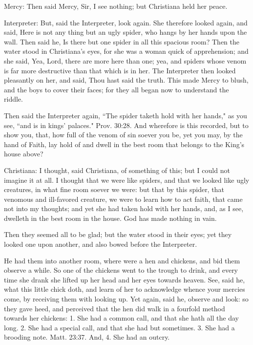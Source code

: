 Mercy: Then said Mercy, Sir, I see nothing; but Christiana held her peace.

Interpreter: But, said the Interpreter, look again. She therefore looked again, and said, Here is not any thing but an ugly spider, who hangs by her hands upon the wall. Then said he, Is there but one spider in all this spacious room? Then the water stood in Christiana's eyes, for she was a woman quick of apprehension; and she said, Yea, Lord, there are more here than one; yea, and spiders whose venom is far more destructive than that which is in her. The Interpreter then looked pleasantly on her, and said, Thou hast said the truth. This made Mercy to blush, and the boys to cover their faces; for they all began now to understand the riddle.

Then said the Interpreter again, ``The spider taketh hold with her hands," as you see, ``and is in kings' palaces." Prov. 30:28. And wherefore is this recorded, but to show you, that, how full of the venom of sin soever you be, yet you may, by the hand of Faith, lay hold of and dwell in the best room that belongs to the King's house above?

Christiana: I thought, said Christiana, of something of this; but I could not imagine it at all. I thought that we were like spiders, and that we looked like ugly creatures, in what fine room soever we were: but that by this spider, that venomous and ill-favored creature, we were to learn how to act faith, that came not into my thoughts; and yet she had taken hold with her hands, and, as I see, dwelleth in the best room in the house. God has made nothing in vain.

Then they seemed all to be glad; but the water stood in their eyes; yet they looked one upon another, and also bowed before the Interpreter.

He had them into another room, where were a hen and chickens, and bid them observe a while. So one of the chickens went to the trough to drink, and every time she drank she lifted up her head and her eyes towards heaven. See, said he, what this little chick doth, and learn of her to acknowledge whence your mercies come, by receiving them with looking up. Yet again, said he, observe and look: so they gave heed, and perceived that the hen did walk in a fourfold method towards her chickens: 1. She had a common call, and that she hath all the day long. 2. She had a special call, and that she had but sometimes. 3. She had a brooding note. Matt. 23:37. And, 4. She had an outcry.

